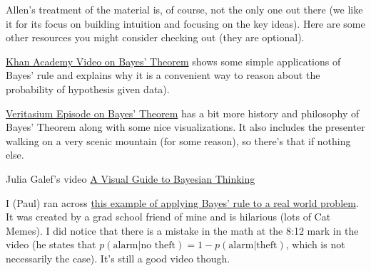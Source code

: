 \documentclass[assignment01_Solutions]{subfiles}
\begin{document}
\begin{externalresources}[(60 minutes)]
Allen's treatment of the material is, of course, not the only one out there (we like it for its focus on building intuition and focusing on the key ideas).  Here are some other resources you might consider checking out (they are optional).
\bi
\item \href{https://www.khanacademy.org/partner-content/wi-phi/wiphi-critical-thinking/wiphi-fundamentals/v/bayes-theorem}{Khan Academy Video on Bayes' Theorem} shows some simple applications of Bayes' rule and explains why it is a convenient way to reason about the probability of hypothesis given data).
\item \href{https://www.youtube.com/watch?v=R13BD8qKeTg}{Veritasium Episode on Bayes' Theorem} has a bit more history and philosophy of Bayes' Theorem along with some nice visualizations.  It also includes the presenter walking on a very scenic mountain (for some reason), so there's that if nothing else.
\item Julia Galef's video \href{https://www.youtube.com/watch?v=BrK7X_XlGB8}{A Visual Guide to Bayesian Thinking}
\item I (Paul) ran across \href{https://youtube.com/watch?v=nvqXXlz-rx0}{this example of applying Bayes' rule to a real world problem}.  It was created by a grad school friend of mine and is hilarious (lots of Cat Memes).  I did notice that there is a mistake in the math at the 8:12 mark in the video (he states that $p(\mbox{alarm} | \mbox{no theft}) = 1 - p(\mbox{alarm} | \mbox{theft})$, which is not necessarily the case).  It's still a good video though.
\ei

\end{externalresources}
\end{document}
